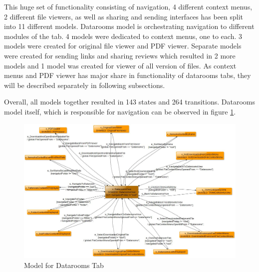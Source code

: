 \par
This huge set of functionality consisting of navigation, 4 different context menus, 2 different file viewers, as well as sharing and sending interfaces has been split into 11 different models. Datarooms model is orchestrating navigation to different modules of the tab. 4 models were dedicated to context menus, one to each. 3 models were created for original file viewer and PDF viewer. Separate models were created for sending links and sharing reviews which resulted in 2 more models and 1 model was created for viewer of all version of files. As context menus and PDF viewer has major share in functionality of datarooms tabs, they will be described separately in following subsections.

\par
Overall, all models together resulted in 143 states and 264 transitions. Datarooms model itself, which is responsible for navigation can be observed in figure \ref{Fig:Datarooms_Model_Screenshot}.

\begin{figure} [htbp!]
	\centering
					\includegraphics[width=1\textwidth]{figures/Datarooms_model_screenshot}
					\caption{\label{Fig:Datarooms_Model_Screenshot} Model for Datarooms Tab}
\end{figure}


